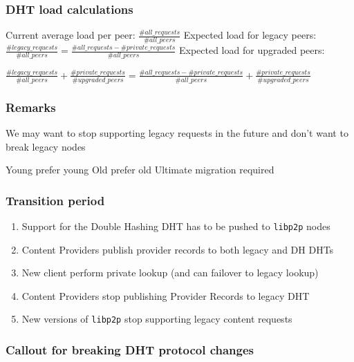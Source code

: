 \documentclass{pl-slide}
\begin{document}
\begin{frame}
\frametitle{DHT load calculations}
\begin{itemize}
	\itemc Current average load per peer: $\frac{\#all\_requests}{\#all\_peers}$
	\itemc Expected load for legacy peers: $\frac{\#legacy\_requests}{\#all\_peers} = \frac{\#all\_requests - \#private\_requests}{\#all\_peers}$
	\itemc Expected load for upgraded peers: \\
	\vspace{1em}	
	
	$\frac{\#legacy\_requests}{\#all\_peers} + \frac{\#private\_requests}{\#upgraded\_peers} = \frac{\#all\_requests - \#private\_requests}{\#all\_peers} + \frac{\#private\_requests}{\#upgraded\_peers}$
\end{itemize}
\end{frame}

\begin{frame}
\frametitle{Remarks}
We may want to stop supporting legacy requests in the future and don't want to break legacy nodes

\bigskip
\begin{itemize}
	\itemc Young prefer young \hspace{2em}
	\itemc Old prefer old \hspace{2em}
	\itemc Ultimate migration required 
\end{itemize}
\end{frame}

\begin{frame}
\frametitle{Transition period}
\begin{enumerate}
	\item Support for the Double Hashing DHT has to be pushed to \texttt{libp2p} nodes
	\item Content Providers publish provider records to both legacy and DH DHTs
	\item New client perform private lookup (and can failover to legacy lookup)
	\item Content Providers stop publishing Provider Records to legacy DHT
	\item New versions of \texttt{libp2p} stop supporting legacy content requests
\end{enumerate}
\end{frame}

\begin{frame}
\frametitle{Callout for breaking DHT protocol changes}
\end{frame}
\end{document}
